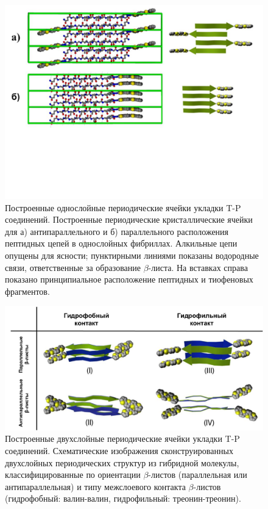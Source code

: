 \begin{figure} [H]
    \centering
    \includegraphics[width=\textwidth]{images/p4/punkt5/part4_p5_f32.pdf}
    \caption[Построенные однослойные периодические  ячейки укладки T-P соединений]{Построенные однослойные периодические  ячейки укладки T-P соединений. Построенные периодические кристаллические ячейки для а) антипараллельного и б) параллельного расположения пептидных цепей в однослойных фибриллах. Алкильные цепи опущены для ясности; пунктирными линиями показаны водородные связи, ответственные за образование $\beta$-листа. На вставках справа показано принципиальное расположение пептидных и тиофеновых фрагментов.}
    \label{fig:p4_p5_f32}
\end{figure}

\begin{figure} [H]
    \centering
    \includegraphics[width=\textwidth]{images/p4/punkt5/part4_p5_f33.pdf}
    \caption[Построенные двухслойные периодические кристаллические ячейки укладки T-P соединений]{Построенные двухслойные периодические  ячейки укладки T-P соединений. Схематические изображения сконструированных двухслойных периодических структур из гибридной молекулы, классифицированные по ориентации $\beta$-листов (параллельная или антипараллельная) и типу межслоевого контакта $\beta$-листов (гидрофобный: валин-валин, гидрофильный: треонин-треонин).}
    \label{fig:p4_p5_f33}
\end{figure}

